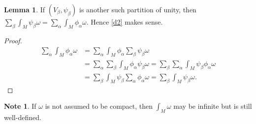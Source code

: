 \documentclass[10pt,letterpaper,cm]{nupset}
\theoremstyle{definition}
\newtheorem{note}[definition]{Note}
\theoremstyle{theorem}
\newtheorem{lemma}[definition]{Lemma}
\theoremstyle{remark}
\newcommand{\1}{\mathbf{1}}
\newcommand{\0}{\vec 0}
\begin{document}
\begin{lemma}
If $(V_{\beta}, \psi_{\beta})$ is another such partition of unity, then $\sum_{\beta}\int_M\psi_{\beta} \omega = \sum_{\alpha}  \int_M \phi_{\alpha} \omega$. Hence \cref{d2} makes sense.
\end{lemma}
\begin{proof}
\begin{align*}
 \sum_{\alpha}  \int_M \phi_{\alpha} \omega
& =  \sum_{\alpha}  \int_M \phi_{\alpha} \sum_{\beta} \psi_{\beta} \omega
\\ & = \sum_{\alpha} \sum_{\beta} \int_M \phi_{\alpha} \psi_{\beta} \omega
 = \sum_{\beta} \sum_{\alpha} \int_M \psi_{\beta} \phi_{\alpha} \omega
\\ & = \sum_{\beta}  \int_M \psi_{\beta} \sum_{\alpha} \phi_{\alpha} \omega
 = \sum_{\beta}\int_M\psi_{\beta} \omega. 
\end{align*}
\end{proof}

\begin{note}
If $\omega$ is not assumed to be compact, then $\int_M \omega$ may be infinite but is still well-defined.
\end{note}
\end{document}
